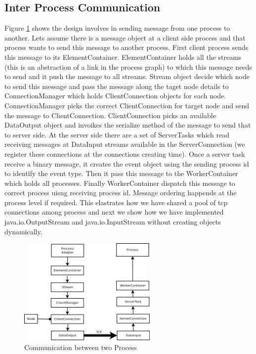 \subsection{Inter Process Communication}
Figure \ref{interprocess} shows the design involves in sending message from one process to another. Lets assume there is a message object at a client side process and that process wants to send this message to another process. First client process sends this message to its ElementContainer. ElementContainer holds all the streams (this is an abstraction of a link in the process graph) to which this message needs to send and it push the message to all streams. Stream object decide which node to send this message and pass the message along the taget node details to ConnectionManager which holds ClientConnection objects for each node. ConnectionManager picks the correct ClientConnection for target node and send the message to ClientConnection. ClientConnection picks an available DataOutput object and invoikes the serialize method of the message to send that to server side.
At the server side there are a set of ServerTasks which read receiving messages at DataInput streams available in the ServerConnection (we register these connections at the connections creating time). Once a server task receive a binary message, it creates the event object using the sending process id to identify the event type. Then it pass this message to the WorkerContainer which holds all processes. Finally WorkerContainer dispatch this message to correct process uisng receiving process id. Message ordering happends at the process level if required. This elastrates how we have shared a pool of tcp connections among process and next we show how we have implemented java.io.OutputStream and java.io.InputStream without creating objects dynamically. 
\begin{figure}
        \centering
        \includegraphics[width=0.6\textwidth]{interprocess.png}
        \caption{Communication between two Process}
        \label{interprocess}
\end{figure}
